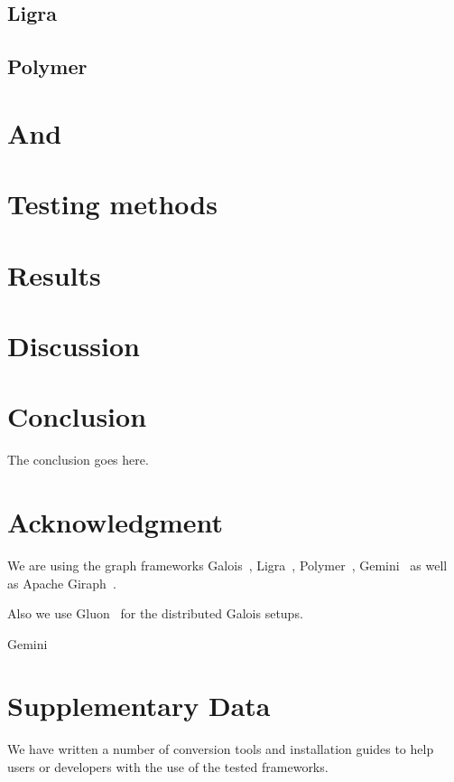 \documentclass[conference,a4paper]{IEEEtran}
\begin{document}
\subsection{Ligra}


\subsection{Polymer}



\section{And}

\section{Testing methods}


\section{Results}



\section{Discussion}




\section{Conclusion}
The conclusion goes here.



\section*{Acknowledgment}
We are using the graph frameworks Galois~\cite{Galois}, Ligra~\cite{Ligra}, Polymer~\cite{Polymer}, Gemini~\cite{Gemini} as well as Apache Giraph~\cite{Giraph}.

Also we use Gluon~\cite{vertGalois} for the distributed Galois setups.

Gemini~\cite{Gemini}


\section*{Supplementary Data}\label{supplementaryData}
We have written a number of conversion tools and installation guides to help
users or developers with the use of the tested frameworks.
\end{document}
